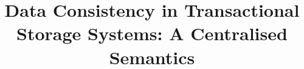 \documentclass[runningheads,anonymous]{llncs}
\title{%
Data Consistency in Transactional Storage Systems: 
A Centralised Semantics%
}
\author{}
\institute{}
\newcommand{\RootPath}{.}
\begin{document}
\maketitle

\begin{abstract}

\end{abstract}






%







\newpage
\onecolumn
\appendix

%
%







%
\end{document}

